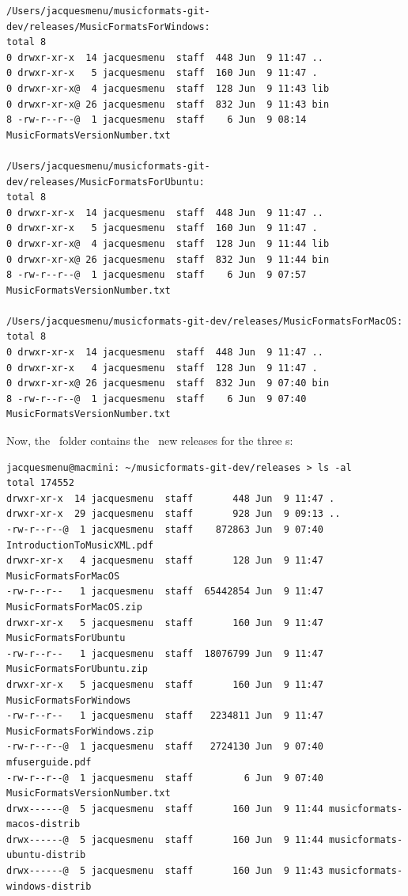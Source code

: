 \begin{enumerate}
\begin{lstlisting}[language=TerminalSmall]
/Users/jacquesmenu/musicformats-git-dev/releases/MusicFormatsForWindows:
total 8
0 drwxr-xr-x  14 jacquesmenu  staff  448 Jun  9 11:47 ..
0 drwxr-xr-x   5 jacquesmenu  staff  160 Jun  9 11:47 .
0 drwxr-xr-x@  4 jacquesmenu  staff  128 Jun  9 11:43 lib
0 drwxr-xr-x@ 26 jacquesmenu  staff  832 Jun  9 11:43 bin
8 -rw-r--r--@  1 jacquesmenu  staff    6 Jun  9 08:14 MusicFormatsVersionNumber.txt

/Users/jacquesmenu/musicformats-git-dev/releases/MusicFormatsForUbuntu:
total 8
0 drwxr-xr-x  14 jacquesmenu  staff  448 Jun  9 11:47 ..
0 drwxr-xr-x   5 jacquesmenu  staff  160 Jun  9 11:47 .
0 drwxr-xr-x@  4 jacquesmenu  staff  128 Jun  9 11:44 lib
0 drwxr-xr-x@ 26 jacquesmenu  staff  832 Jun  9 11:44 bin
8 -rw-r--r--@  1 jacquesmenu  staff    6 Jun  9 07:57 MusicFormatsVersionNumber.txt

/Users/jacquesmenu/musicformats-git-dev/releases/MusicFormatsForMacOS:
total 8
0 drwxr-xr-x  14 jacquesmenu  staff  448 Jun  9 11:47 ..
0 drwxr-xr-x   4 jacquesmenu  staff  128 Jun  9 11:47 .
0 drwxr-xr-x@ 26 jacquesmenu  staff  832 Jun  9 07:40 bin
8 -rw-r--r--@  1 jacquesmenu  staff    6 Jun  9 07:40 MusicFormatsVersionNumber.txt
\end{lstlisting}

Now, the \releasesFolder\ folder contains the \mf\ new releases for the three \OS s:
\begin{lstlisting}[language=TerminalSmall]
jacquesmenu@macmini: ~/musicformats-git-dev/releases > ls -al
total 174552
drwxr-xr-x  14 jacquesmenu  staff       448 Jun  9 11:47 .
drwxr-xr-x  29 jacquesmenu  staff       928 Jun  9 09:13 ..
-rw-r--r--@  1 jacquesmenu  staff    872863 Jun  9 07:40 IntroductionToMusicXML.pdf
drwxr-xr-x   4 jacquesmenu  staff       128 Jun  9 11:47 MusicFormatsForMacOS
-rw-r--r--   1 jacquesmenu  staff  65442854 Jun  9 11:47 MusicFormatsForMacOS.zip
drwxr-xr-x   5 jacquesmenu  staff       160 Jun  9 11:47 MusicFormatsForUbuntu
-rw-r--r--   1 jacquesmenu  staff  18076799 Jun  9 11:47 MusicFormatsForUbuntu.zip
drwxr-xr-x   5 jacquesmenu  staff       160 Jun  9 11:47 MusicFormatsForWindows
-rw-r--r--   1 jacquesmenu  staff   2234811 Jun  9 11:47 MusicFormatsForWindows.zip
-rw-r--r--@  1 jacquesmenu  staff   2724130 Jun  9 07:40 mfuserguide.pdf
-rw-r--r--@  1 jacquesmenu  staff         6 Jun  9 07:40 MusicFormatsVersionNumber.txt
drwx------@  5 jacquesmenu  staff       160 Jun  9 11:44 musicformats-macos-distrib
drwx------@  5 jacquesmenu  staff       160 Jun  9 11:44 musicformats-ubuntu-distrib
drwx------@  5 jacquesmenu  staff       160 Jun  9 11:43 musicformats-windows-distrib
\end{lstlisting}



\end{enumerate}
